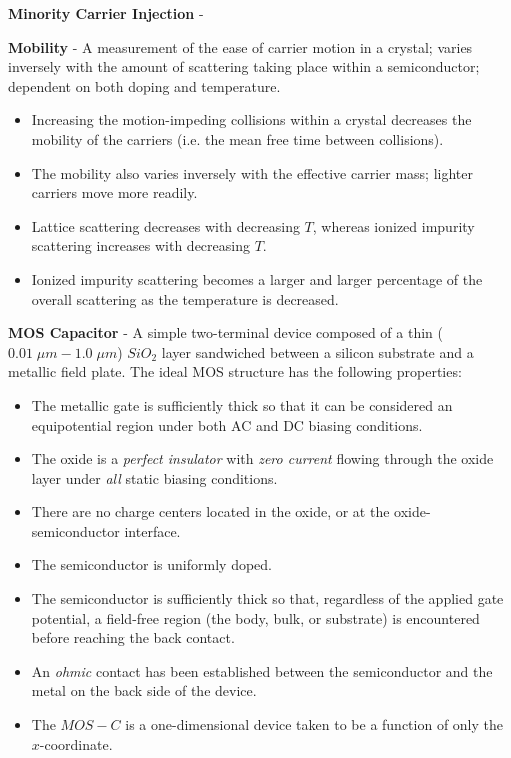 \vspace{0.5cm}
\noindent
    \textbf{Minority Carrier Injection} -

\vspace{0.5cm}
\noindent
    \textbf{Mobility} - A measurement of the ease of carrier motion in a crystal; varies inversely with the amount of scattering taking place within a semiconductor; dependent on both doping and temperature.
    \vspace{0.15cm}
    \begin{itemize}
        \setlength\itemsep{0.5em}
        \item{Increasing the motion-impeding collisions within a crystal decreases the mobility of the carriers (i.e. the mean free time between collisions).}
        \item{The mobility also varies inversely with the effective carrier mass; lighter carriers move more readily.}
        \item{Lattice scattering decreases with decreasing $T$, whereas ionized impurity scattering increases with decreasing $T$.}
        \item{Ionized impurity scattering becomes a larger and larger percentage of the overall scattering as the temperature is decreased.}
    \end{itemize}
\vspace{0.5cm}
    \textbf{MOS Capacitor} - A simple two-terminal device composed of a thin ($0.01\;\mu m - 1.0\;\mu m$) ${SiO}_2$ layer sandwiched between a silicon substrate and a metallic field plate.  The ideal MOS structure has the following properties:
    \vspace{0.15cm}
    \begin{itemize}
        \setlength\itemsep{0.5em}
        \item{The metallic gate is sufficiently thick so that it can be considered an equipotential region under both AC and DC biasing conditions.}
        \item{The oxide is a \emph{perfect insulator} with \emph{zero current} flowing through the oxide layer under \emph{all} static biasing conditions.}
        \item{There are no charge centers located in the oxide, or at the oxide-semiconductor interface.}
        \item{The semiconductor is uniformly doped.}
        \item{The semiconductor is sufficiently thick so that, regardless of the applied gate potential, a field-free region (the body, bulk, or substrate) is encountered before reaching the back contact.}
        \item{An \emph{ohmic} contact has been established between the semiconductor and the metal on the back side of the device.}
        \item{The $MOS-C$ is a one-dimensional device taken to be a function of only the $x$-coordinate.}
    \end{itemize}
